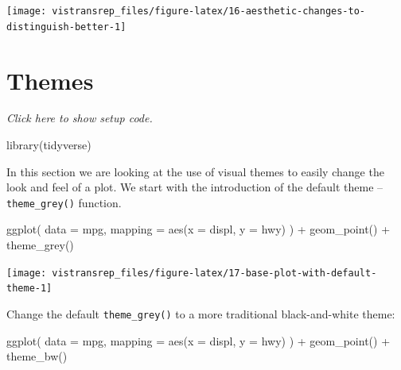 \documentclass[]{book}
\newenvironment{Shaded}{}{}
\newcommand{\DataTypeTok}[1]{#1}
\newcommand{\KeywordTok}[1]{\textcolor[rgb]{0.00,0.00,1.00}{#1}}
\newcommand{\NormalTok}[1]{#1}
\newcommand{\OperatorTok}[1]{#1}
\newcommand{\StringTok}[1]{\textcolor[rgb]{0.00,0.50,0.50}{#1}}
\begin{document}
\begin{flushright}\texttt{[image: vistransrep\_files/figure-latex/16-aesthetic-changes-to-distinguish-better-1]} \end{flushright}

\hypertarget{themes}{%
\section{Themes}\label{themes}}

\emph{Click here to show setup code.}

\begin{Shaded}
\begin{Highlighting}[]
\KeywordTok{library}\NormalTok{(tidyverse)}
\end{Highlighting}
\end{Shaded}

In this section we are looking at the use of visual themes to easily change the look and feel of a plot.
We start with the introduction of the default theme -- \texttt{theme\_grey()} function.

\begin{Shaded}
\begin{Highlighting}[]
\KeywordTok{ggplot}\NormalTok{(}
  \DataTypeTok{data =}\NormalTok{ mpg,}
  \DataTypeTok{mapping =} \KeywordTok{aes}\NormalTok{(}\DataTypeTok{x =}\NormalTok{ displ, }\DataTypeTok{y =}\NormalTok{ hwy)}
\NormalTok{) }\OperatorTok{+}
\StringTok{  }\KeywordTok{geom_point}\NormalTok{() }\OperatorTok{+}
\StringTok{  }\KeywordTok{theme_grey}\NormalTok{()}
\end{Highlighting}
\end{Shaded}

\begin{flushright}\texttt{[image: vistransrep\_files/figure-latex/17-base-plot-with-default-theme-1]} \end{flushright}

Change the default \texttt{theme\_grey()} to a more traditional black-and-white theme:

\begin{Shaded}
\begin{Highlighting}[]
\KeywordTok{ggplot}\NormalTok{(}
  \DataTypeTok{data =}\NormalTok{ mpg,}
  \DataTypeTok{mapping =} \KeywordTok{aes}\NormalTok{(}\DataTypeTok{x =}\NormalTok{ displ, }\DataTypeTok{y =}\NormalTok{ hwy)}
\NormalTok{) }\OperatorTok{+}
\StringTok{  }\KeywordTok{geom_point}\NormalTok{() }\OperatorTok{+}
\StringTok{  }\KeywordTok{theme_bw}\NormalTok{()}
\end{Highlighting}
\end{Shaded}
\end{document}
